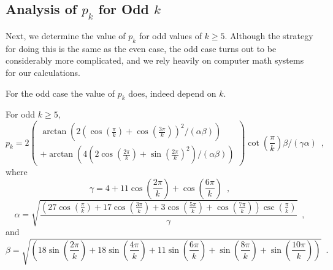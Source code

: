 \documentclass{patmorin}
\begin{document}

\subsection{Analysis of $p_k$ for Odd $k$}

Next, we determine the value of $p_k$ for odd values of
$k\ge 5$.  Although the strategy for doing this is the same as the even
case, the odd case turns out to be considerably more complicated, and
we rely heavily on computer math systems for our calculations.

For the odd case the value of $p_k$ does, indeed depend on $k$.

\begin{lem}
  For odd $k\ge 5$,
\[
p_k = 
2
\left(\begin{array}{l}
  \arctan\left(
     2\left(\cos\left(\frac{\pi }{k}\right)
       +\cos\left(\frac{3 \pi }{k}\right)\right)^2 / (\alpha\beta) 
  \right) \\
   + \arctan\left(
       4 \left(2 \cos\left(\frac{2 \pi }{k}\right)
       +\sin\left(\frac{2 \pi }{k}\right)^2\right)/(\alpha\beta) 
     \right)
  \end{array}
\right)
\cot\left(\frac{\pi }{k}\right) 
\beta
/
\left(\gamma \alpha\right)\enspace ,
\]
where
\[
\gamma =4+11 \cos\left(\frac{2 \pi }{k}\right)+\cos\left(\frac{6 \pi }{k}\right) \enspace ,
\]
\[
\alpha = 
\sqrt{\frac{\left(27 \cos\left(\frac{\pi }{k}\right)+17 \cos\left(\frac{3 \pi }{k}\right)+3 \cos\left(\frac{5 \pi }{k}\right)+\cos\left(\frac{7 \pi }{k}\right)\right) \csc\left(\frac{\pi }{k}\right)}{\gamma}} \enspace ,
\]
and
\[
\beta = \sqrt{\left(18 \sin\left(\frac{2 \pi }{k}\right)+18 \sin\left(\frac{4 \pi }{k}\right)+11 \sin\left(\frac{6 \pi }{k}\right)+\sin\left(\frac{8 \pi }{k}\right)+\sin\left(\frac{10 \pi }{k}\right)\right)} \enspace .
\]
\end{lem}
\end{document}
